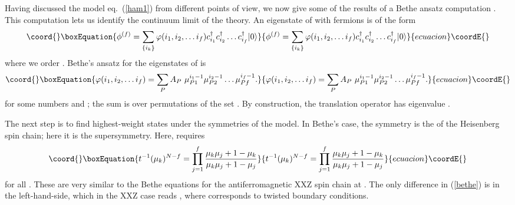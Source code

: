 \documentclass[a4paper,prl,aps,twocolumn]{revtex4}
\begin{document}
Having discussed the model eq.~(\ref{ham1}) from different points of
view, we now give
some of the results of a Bethe ansatz computation \cite{FSii}.
This computation lets us identify the continuum limit of the
theory. An eigenstate of \coordHE{} with \coordHE{} fermions is of the form  
\begin{equation}\coord{}\boxEquation{  
\phi^{(f)} = \sum_{\{i_k\}} \varphi(i_1,i_2,\dots i_f)  
c^\dagger_{i_1}c^\dagger_{i_2}\dots c^\dagger_{i_f}|0\rangle   
\label{Phidef}  
}{  
\phi^{(f)} = \sum_{\{i_k\}} \varphi(i_1,i_2,\dots i_f)  
c^\dagger_{i_1}c^\dagger_{i_2}\dots c^\dagger_{i_f}|0\rangle   
}{ecuacion}\coordE{}\end{equation}  
where we order \coordHE{}.   
Bethe's ansatz for the eigenstates of \coordHE{} is \cite{Bethe}
\begin{equation}\coord{}\boxEquation{\varphi(i_1,i_2,\dots i_f) = \sum_P  
A_P\  \mu_{P1}^{i_1-1}\mu_{P2}^{i_2-1}\dots \mu_{Pf}^{i_f-1}.  
\label{phidef}  
}{\varphi(i_1,i_2,\dots i_f) = \sum_P  
A_P\  \mu_{P1}^{i_1-1}\mu_{P2}^{i_2-1}\dots \mu_{Pf}^{i_f-1}.  
}{ecuacion}\coordE{}\end{equation}  
for some numbers \coordHE{} and \coordHE{}; the sum is over  
permutations \coordHE{} of the set \coordHE{}. By construction, the
translation operator \coordHE{} has eigenvalue \coordHE{}.

The next step is to find highest-weight states under the symmetries of 
the model. In  
Bethe's case, the symmetry is the \coordHE{} of the Heisenberg spin  
chain; here it is the supersymmetry. Here, \coordHE{} 
requires
\begin{equation}\coord{}\boxEquation{  
t^{-1} (\mu_k)^{N-f}  = \prod_{j=1}^f   
\frac{\mu_k\mu_j +1 - \mu_k}{\mu_k\mu_j +1 -\mu_j}  
\label{bethe}  
}{  
t^{-1} (\mu_k)^{N-f}  = \prod_{j=1}^f   
\frac{\mu_k\mu_j +1 - \mu_k}{\mu_k\mu_j +1 -\mu_j}  
}{ecuacion}\coordE{}\end{equation}  
for all \coordHE{}. 
These
are very similar to the Bethe equations for the antiferromagnetic
XXZ spin chain at \coordHE{} \cite{Baxter}.  The only
difference in (\ref{bethe}) is in the left-hand-side, which in the XXZ
case reads \coordHE{}, where \coordHE{} corresponds to twisted
boundary conditions.
\end{document}
